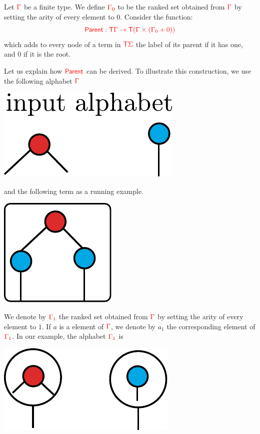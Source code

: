 \noindent \begin{example}\label{ex:sibling}  Let ${\color{red}{\Gamma}}$ be a finite type. We define ${\color{red}{{\color{red}{\Gamma}}_0}}$  to be the ranked set obtained from ${\color{red}{\Gamma}}$ by setting the arity of every element to $0$.  
\medskip
Consider the function:
$${\color{red}{ \mathsf{Parent}: {\color{red}{\mathsf T}}{\color{red}{\Gamma}}\to {\color{red}{\mathsf T}}({\color{red}{\Gamma}}\times({\color{red}{\Gamma}}_0+0))}}$$
which adds to every node of a term in ${\color{red}{\mathsf T}} {\color{red}{\Sigma}}$ the label  of its parent if it has one, and $0$ if it is the root.

Let us explain how ${\color{red}{\mathsf{Parent}}}$ can be derived. To illustrate this construction, we use the following alphabet ${\color{red}{\Gamma}}$
\begin{center}
		 \includegraphics[scale=.4]{pictures/parent-alphabet.pdf}
		\end{center}
and the following term as a running example.
\begin{center}
		 \includegraphics[scale=.4]{pictures/parent-example.pdf}
		\end{center}
We denote by ${\color{red}{\Gamma_1}}$ the ranked set obtained from ${\color{red}{\Gamma}}$ by setting the arity of every element to $1$. If $a$ is a element of ${\color{red}{\Gamma}}$, we denote by $a_1$ the corresponding element of ${\color{red}{\Gamma_1}}$. In our example, the alphabet ${\color{red}{\Gamma_1}}$ is
\begin{center}
		\includegraphics[scale=.4]{pictures/parent-unary-alphabet.pdf}

\end{center}
\end{example}
